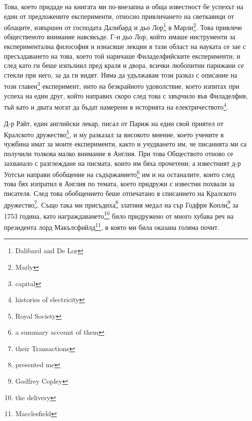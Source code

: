 \documentclass[12pt]{book}
\begin{document}
Това, което придаде на книгата ми по-внезапна и обща известност бе успехът на един от предложените експерименти, относно привличането на светкавици от облаците, извършен от господата Далибард и дьо Лор\footnote{Dalibard and De Lor} в Марли\footnote{Marly}. Това привлече общественото внимание навсякъде. Г-н дьо Лор, който имаше инструменти за експериментална философия и изнасяше лекции в тази област на науката се зае с пресъздаването на това, което той наричаше Филаделфийските експерименти; и след като ги беше изпълнил пред краля и двора, всички любопитни парижани се стекли при него, за да ги видят. Няма да удължавам този разказ с описание на този главен\footnote{capital} експеримент, нито на безкрайното удоволствие, което изпитах при успеха на един друг, който направих скоро след това с хвърчило във Филаделфия, тъй като и двата могат да бъдат намерени в историята на електричеството\footnote{histories of electricity}. 

Д-р Райт, един английски лекар, писал от Париж на един свой приятел от Кралското дружество\footnote{Royal Society}, и му разказал за високото мнение, което учените в чужбина имат за моите експерименти, както и учудването им, че писанията ми са получили толкова малко внимание в Англия. При това Обществото отново се захванало с разглеждане на писмата, които им бяха прочетени; а известният д-р Уотсън направи обобщение на съдържанието\footnote{a summary account of them} им и на останалите, които след това бях изпратил в Англия по темата, което придружи с известни похвали за писателя. След това обобщението беше отпечатано в списанието на Кралското дружество\footnote{their Transactions}. Също така ми присъдиха\footnote{presented me} златния медал на сър Годфри Копли\footnote{Godfrey Copley} за 1753 година, като награждаването\footnote{the delivery} било придружено от много хубава реч на президента лорд Макълсфийлд\footnote{Macclesfield}, в която ми била оказана голяма почит. 
\end{document}
